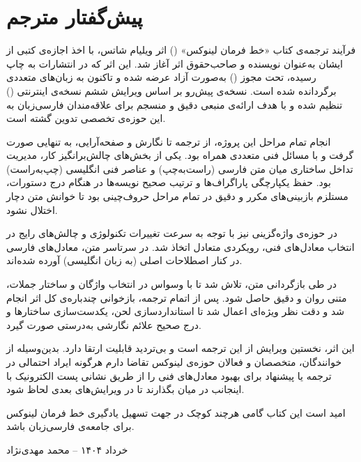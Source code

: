 \chapter*{پیش‌گفتار مترجم}

فرآیند ترجمه‌ی کتاب «خط فرمان لینوکس» () اثر ویلیام شاتس، با اخذ اجازه‌ی کتبی از ایشان به‌عنوان نویسنده و صاحب‌حقوق اثر آغاز شد. این اثر که در انتشارات  به چاپ رسیده، تحت مجوز  () به‌صورت آزاد عرضه شده و تاکنون به زبان‌های متعددی برگردانده شده است. نسخه‌ی پیش‌رو بر اساس ویرایش ششم نسخه‌ی اینترنتی () تنظیم شده و با هدف ارائه‌ی منبعی دقیق و منسجم برای علاقه‌مندان فارسی‌زبان به این حوزه‌ی تخصصی تدوین گشته است.

انجام تمام مراحل این پروژه، از ترجمه تا نگارش و صفحه‌آرایی، به تنهایی صورت گرفت و با مسائل فنی متعددی همراه بود. یکی از بخش‌های چالش‌برانگیز کار، مدیریت تداخل ساختاری میان متن فارسی (راست‌به‌چپ) و عناصر فنی انگلیسی (چپ‌به‌راست) بود. حفظ یکپارچگی پاراگراف‌ها و ترتیب صحیح نویسه‌ها در هنگام درج دستورات، مستلزم بازبینی‌های مکرر و دقیق در تمام مراحل حروف‌چینی بود تا خوانش متن دچار اختلال نشود.

در حوزه‌ی واژه‌گزینی نیز با توجه به سرعت تغییرات تکنولوژی و چالش‌های رایج در انتخاب معادل‌های فنی، رویکردی متعادل اتخاذ شد. در سرتاسر متن، معادل‌های فارسی در کنار اصطلاحات اصلی (به زبان انگلیسی) آورده شده‌اند.

در طی بازگردانی متن، تلاش شد تا با وسواس در انتخاب واژگان و ساختار جملات، متنی روان و دقیق حاصل شود. پس از اتمام ترجمه، بازخوانی چندباره‌ی کل اثر انجام شد و دقت نظر ویژه‌ای اعمال شد تا استانداردسازی لحن، یکدست‌سازی ساختارها و درج صحیح علائم نگارشی به‌درستی صورت گیرد.

این اثر، نخستین ویرایش از این ترجمه است و بی‌تردید قابلیت ارتقا دارد. بدین‌وسیله از خوانندگان، متخصصان و فعالان حوزه‌ی لینوکس تقاضا دارم هرگونه ایراد احتمالی در ترجمه یا پیشنهاد برای بهبود معادل‌های فنی را از طریق نشانی پست الکترونیک  با اینجانب در میان بگذارند تا در ویرایش‌های بعدی لحاظ شود.

امید است این کتاب گامی هرچند کوچک در جهت تسهیل یادگیری خط فرمان لینوکس برای جامعه‌ی فارسی‌زبان باشد.

\vspace{1.5em}
\begin{flushleft}
خرداد ۱۴۰۴ – محمد مهدی‌نژاد
\end{flushleft}